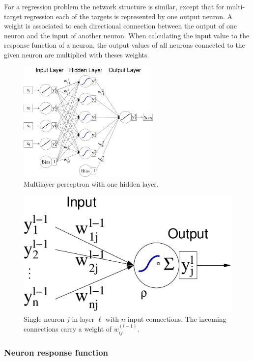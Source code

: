 For a regression problem the network structure is similar, except that 
for multi-target regression each of the targets is represented by one
output neuron.
A weight is associated to each directional connection between the output 
of one neuron and the input of another neuron.  When calculating the input 
value to the response function of a neuron, the output values of all 
neurons connected to the given neuron are multiplied with theses weights.
\begin{figure}[t]
  \centering
  \includegraphics[width=0.62\textwidth]{plots/MLP}
  \caption[.]{Multilayer perceptron with one hidden layer.}
  \label{fig:mlp:nw}
\end{figure}
\begin{figure}[t]
  \centering
  \includegraphics[width=.30\textwidth]{plots/MLP_SingleNode}
  \caption[.]{Single neuron $j$ in layer $\ell$ with $n$ input connections. The
    incoming connections carry a weight of $w_{ij}^{(l-1)}$.}
  \label{fig:mlp:node}
\end{figure}

\subsubsection*{Neuron response function}

